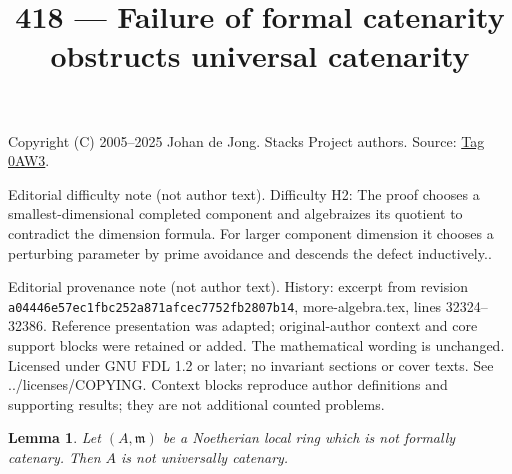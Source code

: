 \documentclass{amsart}
\theoremstyle{plain}
\newtheorem{lemma}[subsection]{Lemma}
\theoremstyle{definition}
\theoremstyle{remark}
\numberwithin{equation}{subsection}
\begin{document}
\title[Stacks Project, Tag 0AW3]{418 --- Failure of formal catenarity obstructs universal catenarity}
\maketitle
\noindent Copyright (C) 2005--2025 Johan de Jong. Stacks Project authors. Source: \href{https://stacks.math.columbia.edu/tag/0AW3}{Tag 0AW3}.

\noindent Editorial difficulty note (not author text). Difficulty H2: The proof chooses a smallest-dimensional completed component and algebraizes its quotient to contradict the dimension formula. For larger component dimension it chooses a perturbing parameter by prime avoidance and descends the defect inductively..

\noindent Editorial provenance note (not author text). History: excerpt from revision \texttt{a0444\allowbreak 6e57e\allowbreak c1fbc\allowbreak 252a8\allowbreak 71afc\allowbreak ec775\allowbreak 2fb28\allowbreak 07b14}, more-algebra.tex, lines 32324--32386. Reference presentation was adapted; original-author context and core support blocks were retained or added. The mathematical wording is unchanged. Licensed under GNU FDL 1.2 or later; no invariant sections or cover texts. See ../licenses/COPYING. Context blocks reproduce author definitions and supporting results; they are not additional counted problems.

\begin{lemma}
\label{lemma-not-formally-catenary}
Let $(A, \mathfrak m)$ be a Noetherian local ring which is not
formally catenary. Then $A$ is not universally catenary.
\end{lemma}
\end{document}
